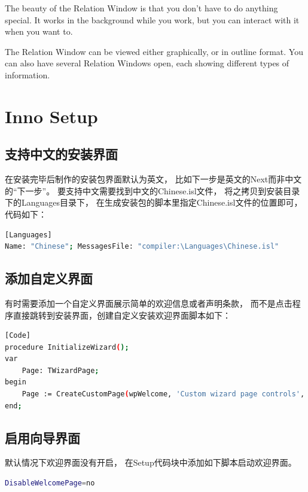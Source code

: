 \documentclass{book}
\begin{document}
The beauty of the Relation Window is that you don’t have to do anything special. 
It works in the background while you work, 
but you can interact with it when you want to.

The Relation Window can be viewed either graphically, 
or in outline format. You can also have several Relation Windows open, 
each showing different types of information.

\section{Inno Setup}

\subsection{支持中文的安装界面}

在安装完毕后制作的安装包界面默认为英文，
比如下一步是英文的Next而非中文的“下一步”。
要支持中文需要找到中文的Chinese.isl文件，
将之拷贝到安装目录下的Languages目录下，
在生成安装包的脚本里指定Chinese.isl文件的位置即可，
代码如下：

\begin{lstlisting}[language=Bash]
[Languages]
Name: "Chinese"; MessagesFile: "compiler:\Languages\Chinese.isl"
\end{lstlisting}

\subsection{添加自定义界面}

有时需要添加一个自定义界面展示简单的欢迎信息或者声明条款，
而不是点击程序直接跳转到安装界面，创建自定义安装欢迎界面脚本如下：

\begin{lstlisting}[language=Bash]
[Code]
procedure InitializeWizard();
var
	Page: TWizardPage;
begin
	Page := CreateCustomPage(wpWelcome, 'Custom wizard page controls', 'TButton and others');
end;
\end{lstlisting}

\subsection{启用向导界面}

默认情况下欢迎界面没有开启，
在Setup代码块中添加如下脚本启动欢迎界面。

\begin{lstlisting}[language=Bash]
DisableWelcomePage=no
\end{lstlisting}
\end{document}
